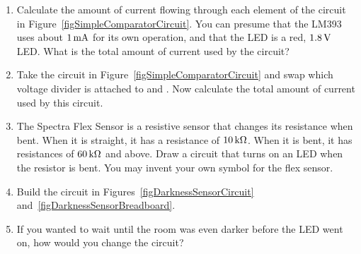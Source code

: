 \applysection

\begin{enumerate}
\item  Calculate the amount of current flowing through each element of the circuit in Figure~\ref{figSimpleComparatorCircuit}.  You can presume that the LM393 uses about $1\,\si{\milli\ampere}$ for its own operation, and that the LED is a red, $1.8\,\si{\volt}$ LED.  What is the total amount of current used by the circuit?
\item Take the circuit in Figure~\ref{figSimpleComparatorCircuit} and swap which voltage divider is attached to  and .  Now calculate the total amount of current used by this circuit.
\item The Spectra Flex Sensor is a resistive sensor that changes its resistance when bent.  When it is straight, it has a resistance of $10\,\si{\kilo\ohm}$.  When it is bent, it has resistances of $60\,\si{\kilo\ohm}$ and above.  Draw a circuit that turns on an LED when the resistor is bent.  You may invent your own symbol for the flex sensor.
\item Build the circuit in Figures~\ref{figDarknessSensorCircuit} and~\ref{figDarknessSensorBreadboard}. 
\item If you wanted to wait until the room was even darker before the LED went on, how would you change the circuit?
\end{enumerate}
